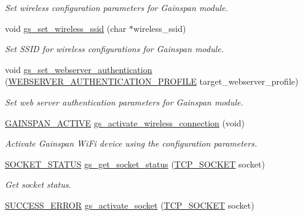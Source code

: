 \begin{DoxyCompactItemize}
\begin{DoxyCompactList}\small\item\em Set wireless configuration parameters for Gainspan module. \end{DoxyCompactList}\item 
void \hyperlink{group__wireless__interface_gaf865756bf94aa3102d6409a85fbd0f48}{gs\+\_\+set\+\_\+wireless\+\_\+ssid} (char $\ast$wireless\+\_\+ssid)
\begin{DoxyCompactList}\small\item\em Set S\+S\+ID for wireless configurations for Gainspan module. \end{DoxyCompactList}\item 
void \hyperlink{group__wireless__interface_gababe539199e257225dc592210b7488c1}{gs\+\_\+set\+\_\+webserver\+\_\+authentication} (\hyperlink{group__wireless__interface_struct_w_e_b_s_e_r_v_e_r___a_u_t_h_e_n_t_i_c_a_t_i_o_n___p_r_o_f_i_l_e}{W\+E\+B\+S\+E\+R\+V\+E\+R\+\_\+\+A\+U\+T\+H\+E\+N\+T\+I\+C\+A\+T\+I\+O\+N\+\_\+\+P\+R\+O\+F\+I\+LE} target\+\_\+webserver\+\_\+profile)
\begin{DoxyCompactList}\small\item\em Set web server authentication parameters for Gainspan module. \end{DoxyCompactList}\item 
\hyperlink{group__wireless__interface_ga2d6a1c69aec7812a8dc23ed99f96558e}{G\+A\+I\+N\+S\+P\+A\+N\+\_\+\+A\+C\+T\+I\+VE} \hyperlink{group__wireless__interface_ga880dacf1b386b927ddea018919b6b600}{gs\+\_\+activate\+\_\+wireless\+\_\+connection} (void)
\begin{DoxyCompactList}\small\item\em Activate Gainspan Wi\+Fi device using the configuration parameters. \end{DoxyCompactList}\item 
\hyperlink{group__wireless__interface_gab7faea06bd57469129426e00fcdfe8c7}{S\+O\+C\+K\+E\+T\+\_\+\+S\+T\+A\+T\+US} \hyperlink{group__wireless__interface_ga8734bea20a2f6ea1e7b6d24e0b5a3508}{gs\+\_\+get\+\_\+socket\+\_\+status} (\hyperlink{group__wireless__interface_gab2d7ad3f99c2b04b0f5f5a77eefc5355}{T\+C\+P\+\_\+\+S\+O\+C\+K\+ET} socket)
\begin{DoxyCompactList}\small\item\em Get socket status. \end{DoxyCompactList}\item 
\hyperlink{group__wireless__interface_ga2e53871073b531f122f463441c113633}{S\+U\+C\+C\+E\+S\+S\+\_\+\+E\+R\+R\+OR} \hyperlink{group__wireless__interface_gabc31d81e6c01f7906a21f41e7aa4a42f}{gs\+\_\+activate\+\_\+socket} (\hyperlink{group__wireless__interface_gab2d7ad3f99c2b04b0f5f5a77eefc5355}{T\+C\+P\+\_\+\+S\+O\+C\+K\+ET} socket)

\end{DoxyCompactItemize}
